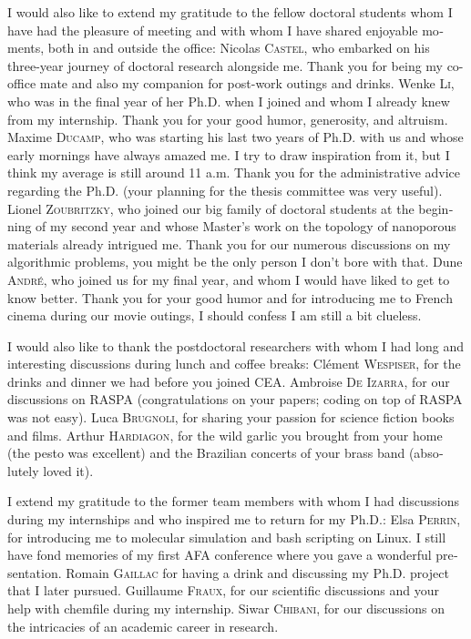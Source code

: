 \begin{otherlanguage}{english}
I would also like to extend my gratitude to the fellow doctoral students whom I have had the pleasure of meeting and with whom I have shared enjoyable moments, both in and outside the office: 
Nicolas \textsc{Castel}, who embarked on his three-year journey of doctoral research alongside me. Thank you for being my co-office mate and also my companion for post-work outings and drinks.
Wenke \textsc{Li}, who was in the final year of her Ph.D. when I joined and whom I already knew from my internship. Thank you for your good humor, generosity, and altruism.
Maxime \textsc{Ducamp}, who was starting his last two years of Ph.D. with us and whose early mornings have always amazed me. I try to draw inspiration from it, but I think my average is still around 11 a.m. Thank you for the administrative advice regarding the Ph.D. (your planning for the thesis committee was very useful).
Lionel \textsc{Zoubritzky}, who joined our big family of doctoral students at the beginning of my second year and whose Master's work on the topology of nanoporous materials already intrigued me. Thank you for our numerous discussions on my algorithmic problems, you might be the only person I don't bore with that.
Dune \textsc{André}, who joined us for my final year, and whom I would have liked to get to know better. Thank you for your good humor and for introducing me to French cinema during our movie outings, I should confess I am still a bit clueless.

I would also like to thank the postdoctoral researchers with whom I had long and interesting discussions during lunch and coffee breaks:
Clément \textsc{Wespiser}, for the drinks and dinner we had before you joined CEA.
Ambroise \textsc{De Izarra}, for our discussions on RASPA (congratulations on your papers; coding on top of RASPA was not easy).
Luca \textsc{Brugnoli}, for sharing your passion for science fiction books and films.
Arthur \textsc{Hardiagon}, for the wild garlic you brought from your home (the pesto was excellent) and the Brazilian concerts of your brass band (absolutely loved it). 

I extend my gratitude to the former team members with whom I had discussions during my internships and who inspired me to return for my Ph.D.:
Elsa \textsc{Perrin}, for introducing me to molecular simulation and {\normalfont bash} scripting on {\normalfont Linux}. I still have fond memories of my first {\normalfont AFA} conference where you gave a wonderful presentation. 
Romain \textsc{Gaillac} for having a drink and discussing my Ph.D. project that I later pursued.
Guillaume \textsc{Fraux}, for our scientific discussions and your help with {\normalfont chemfile} during my internship.
Siwar \textsc{Chibani}, for our discussions on the intricacies of an academic career in research.


\end{otherlanguage}
